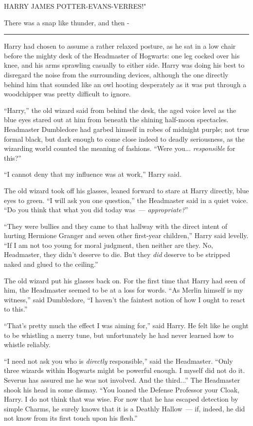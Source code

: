 HARRY JAMES POTTER-EVANS-VERRES!"

There was a snap like thunder, and then -

\begin{center}\rule{3in}{0.4pt}\end{center}

Harry had chosen to assume a rather relaxed posture, as he sat in a low chair before the mighty desk of the Headmaster of Hogwarts: one leg cocked over his knee, and his arms sprawling casually to either side. Harry was doing his best to disregard the noise from the surrounding devices, although the one directly behind him that sounded like an owl hooting desperately as it was put through a woodchipper was pretty difficult to ignore.

``Harry,'' the old wizard said from behind the desk, the aged voice level as the blue eyes stared out at him from beneath the shining half-moon spectacles. Headmaster Dumbledore had garbed himself in robes of midnight purple; not true formal black, but dark enough to come close indeed to deadly seriousness, as the wizarding world counted the meaning of fashions. ``Were you... \emph{responsible} for this?''

``I cannot deny that my influence was at work,'' Harry said.

The old wizard took off his glasses, leaned forward to stare at Harry directly, blue eyes to green. ``I will ask you one question,'' the Headmaster said in a quiet voice. ``Do you think that what you did today was~--- \emph{appropriate?}''

``They were bullies and they came to that hallway with the direct intent of hurting Hermione Granger and seven other first-year children,'' Harry said levelly. ``If I am not too young for moral judgment, then neither are they. No, Headmaster, they didn't deserve to die. But they \emph{did} deserve to be stripped naked and glued to the ceiling.''

The old wizard put his glasses back on. For the first time that Harry had seen of him, the Headmaster seemed to be at a loss for words. ``As Merlin himself is my witness,'' said Dumbledore, ``I haven't the faintest notion of how I ought to react to this.''

``That's pretty much the effect I was aiming for,'' said Harry. He felt like he ought to be whistling a merry tune, but unfortunately he had never learned how to whistle reliably.

``I need not ask you who is \emph{directly} responsible,'' said the Headmaster. ``Only three wizards within Hogwarts might be powerful enough. I myself did not do it. Severus has assured me he was not involved. And the third...'' The Headmaster shook his head in some dismay. ``You loaned the Defense Professor your Cloak, Harry. I do not think that was wise. For now that he has escaped detection by simple Charms, he surely knows that it is a Deathly Hallow~--- if, indeed, he did not know from its first touch upon his flesh.''


